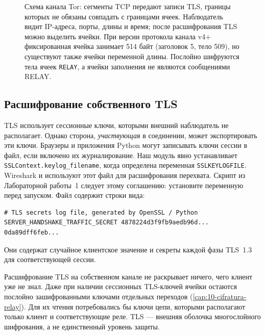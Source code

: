\begin{figure}[htbp]
\centering

\caption{Схема канала Tor: сегменты TCP передают записи TLS, границы которых не обязаны совпадать с границами ячеек. Наблюдатель видит IP-адреса, порты, длины и время; после расшифрования TLS можно выделить ячейки. При версии протокола канала v4+ фиксированная ячейка занимает 514 байт (заголовок 5, тело 509), но существуют также ячейки переменной длины. Послойно шифруются тела ячеек \texttt{RELAY}, а ячейки заполнения не являются сообщениями RELAY.}
\label{fig:incapsulamento}
\end{figure}

\subsection{Расшифрование собственного TLS}

TLS использует сессионные ключи, которыми внешний наблюдатель не располагает. Однако сторона, \emph{участвующая} в соединении, может экспортировать эти ключи. Браузеры и приложения Python могут записывать ключи сессии в файл, если включено их журналирование. Наш модуль  явно устанавливает \texttt{SSLContext.keylog\_filename}, когда определена переменная \texttt{SSLKEYLOGFILE}. Wireshark и  используют этот файл для расшифрования перехвата. Скрипт  из Лабораторной работы~1 следует этому соглашению: установите переменную перед запуском. Файл содержит строки вида:
\begin{lstlisting}[numbers=none]
# TLS secrets log file, generated by OpenSSL / Python
SERVER_HANDSHAKE_TRAFFIC_SECRET 4878224d3f9fb9aedb96d... 0da89dff6feb...
\end{lstlisting}
Они содержат случайное клиентское значение и секреты каждой фазы TLS~1.3 для соответствующей сессии.

\begin{approfondimento}
Расшифрование TLS на собственном канале не раскрывает ничего, чего клиент уже не знал. Даже при наличии сессионных TLS-ключей ячейки  остаются послойно зашифрованными ключами отдельных переходов (\cref{cap:10-cifratura-relay}). Для их чтения потребовались бы ключи цепи, которыми располагают только клиент и соответствующие реле. TLS — внешняя оболочка многослойного шифрования, а не единственный уровень защиты.
\end{approfondimento}

